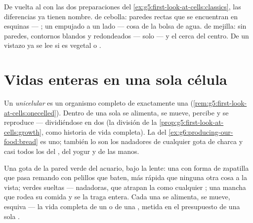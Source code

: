 \begin{example}\label{ex:g6:cell-unit-of-life:slides}
De vuelta al  con las dos preparaciones del
\cref{ex:g5:first-look-at-cells:classics}, las diferencias ya tienen
nombre.  de cebolla: paredes rectas que se encuentran en esquinas
--- ; un  empujado a un lado --- cosa de la
bolsa de agua.  de mejilla: sin paredes, contornos blandos y
redondeados --- solo  --- y el  cerca del centro. De un
vistazo ya se lee si es vegetal o .
\end{example}

\section{Vidas enteras en una sola célula}

\begin{definition}\label{def:g6:cell-unit-of-life:unicellular}
Un  \emph{unicelular} es un organismo
completo de exactamente una 
(\cref{rem:g5:first-look-at-cells:onecelled}). Dentro de una sola
 se alimenta, se mueve, percibe y se reproduce --- dividiéndose
en dos (la división de la \cref{prop:g5:first-look-at-cells:growth},
como historia de vida completa). La  del
\cref{ex:g6:producing-our-food:bread} es uno; también lo son los
nadadores de cualquier gota de charca y casi todos los  del
, del yogur y de las manos.
\end{definition}

\begin{example}\label{ex:g6:cell-unit-of-life:drop}
Una gota de la pared verde del acuario, bajo la lente: una  con
forma de zapatilla que pasa remando con pelillos que baten, más rápida
que ninguna otra cosa a la vista;  verdes sueltas ---
 nadadoras, que atrapan la  como cualquier ; una
mancha que rodea su comida y se la traga entera. Cada una se alimenta,
se mueve, esquiva --- la vida completa de un  o de una ,
metida en el presupuesto de una sola .
\end{example}

